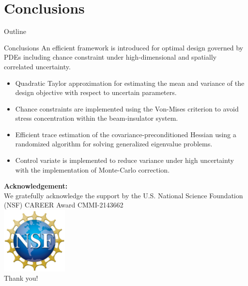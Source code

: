 \documentclass[10pt,xcolor=dvipsnames,compress]{beamer}
\begin{document}
\section{Conclusions}
\begin{frame}{Outline}
    \tableofcontents[currentsection]
\end{frame}
\begin{frame}{Conclusions}
\small
An efficient framework is introduced for optimal design governed by PDEs including chance constraint under high-dimensional and spatially correlated uncertainty.\vspace{0.05 in}
    \begin{itemize}
        \item Quadratic Taylor approximation for estimating the mean and variance of the design objective with respect to uncertain parameters.
        \vspace{0.05 in}
        \item Chance constraints are implemented using the Von-Mises criterion to avoid \\stress concentration within the beam-insulator system.\vspace{0.05 in}
        \item Efficient trace estimation of the covariance-preconditioned Hessian using a randomized algorithm for solving generalized eigenvalue problems.\vspace{0.05 in}
        \item Control variate is implemented to reduce variance under high uncertainty with the implementation of Monte-Carlo correction.\vspace{0.05 in}
    \end{itemize}
    
\end{frame}

\begin{frame}
    \begin{center}
    \large
    \textbf{Acknowledgement:}\\
        We gratefully acknowledge the support by the U.S. National Science Foundation (NSF) CAREER Award CMMI-2143662\vspace{0.1 in}\\
        \includegraphics[width=0.25\textwidth]{Figures/NSF.png}\\
        \huge{Thank you!}
    \end{center}
\end{frame}




\end{document}
